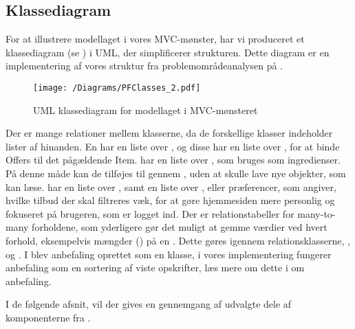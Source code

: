 \subsection{Klassediagram}
For at illustrere modellaget i vores MVC-mønster, har vi produceret et klassediagram (se ) i UML, der simplificerer strukturen. 
Dette diagram er en implementering af vores struktur fra problemområdeanalysen på .

\begin{figure}[h!]
\centering
 \texttt{[image: /Diagrams/PFClasses\_2.pdf]} %
\caption{UML klassediagram for modellaget i MVC-mønsteret}\label{diagram:klassediagram}
\end{figure}

Der er mange relationer mellem klasserne, da de forskellige klasser indeholder lister af hinanden.
En  har en liste over , og disse  har en liste over , for at binde Offers til det pågældende Item.
 har en liste over , som bruges som ingredienser.
På denne måde kan de tilføjes til  gennem , uden at skulle lave nye objekter, som  kan læse.
 har en liste over , samt en liste over , eller præferencer, som angiver, hvilke tilbud der skal filtreres væk, for at gøre hjemmesiden mere personlig og fokuseret på brugeren, som er logget ind.
Der er relationstabeller for many-to-many forholdene, som yderligere gør det muligt at gemme værdier ved hvert forhold, eksempelvis mængder () på en .
Dette gøres igennem relationsklasserne, , og .
I  blev anbefaling oprettet som en klasse, i vores implementering fungerer anbefaling som en sortering af viste opskrifter, læs mere om dette i  om anbefaling.

I de følgende afsnit, vil der gives en gennemgang af udvalgte dele af komponenterne fra .

